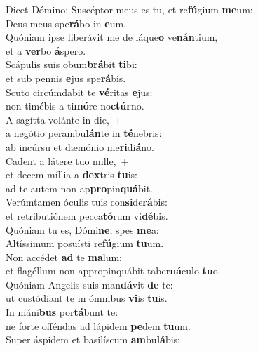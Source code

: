 \evenverse Dicet Dómino: Suscéptor meus es tu, et re\textbf{fú}gium \textbf{me}um:~\*\\
\evenverse Deus meus spe\textbf{rá}bo in \textbf{e}um.\\
\oddverse Quóniam ipse liberávit me de láque\textbf{o} ve\textbf{nán}tium,~\*\\
\oddverse et a \textbf{ver}bo \textbf{á}spero.\\
\evenverse Scápulis suis obum\textbf{brá}bit \textbf{ti}bi:~\*\\
\evenverse et sub pennis \textbf{e}jus spe\textbf{rá}bis.\\
\oddverse Scuto circúmdabit te \textbf{vé}ritas \textbf{e}jus:~\*\\
\oddverse non timébis a ti\textbf{mó}re no\textbf{ctúr}no.\\
\evenverse A sagítta volánte in die,~+\\
\evenverse  a negótio perambu\textbf{lán}te in \textbf{té}nebris:~\*\\
\evenverse ab incúrsu et dæmónio me\textbf{ri}di\textbf{á}no.\\
\oddverse Cadent a látere tuo mille,~+\\
\oddverse  et decem míllia a \textbf{dex}tris \textbf{tu}is:~\*\\
\oddverse ad te autem non ap\textbf{pro}pin\textbf{quá}bit.\\
\evenverse Verúmtamen óculis tuis con\textbf{si}de\textbf{rá}bis:~\*\\
\evenverse et retributiónem pecca\textbf{tó}rum vi\textbf{dé}bis.\\
\oddverse Quóniam tu es, Dómi\textbf{ne}, spes \textbf{me}a:~\*\\
\oddverse Altíssimum posuísti re\textbf{fú}gium \textbf{tu}um.\\
\evenverse Non accédet \textbf{ad} te \textbf{ma}lum:~\*\\
\evenverse et flagéllum non appropinquábit taber\textbf{ná}culo \textbf{tu}o.\\
\oddverse Quóniam Angelis suis man\textbf{dá}vit \textbf{de} te:~\*\\
\oddverse ut custódiant te in ómnibus \textbf{vi}is \textbf{tu}is.\\
\evenverse In máni\textbf{bus} por\textbf{tá}bunt te:~\*\\
\evenverse ne forte offéndas ad lápidem \textbf{pe}dem \textbf{tu}um.\\
\oddverse Super áspidem et basilíscum \textbf{am}bu\textbf{lá}bis:~\*\\
